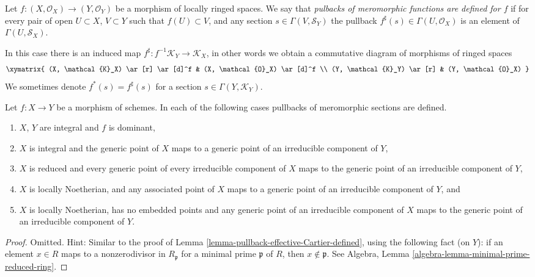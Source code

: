 \begin{definition}
\label{definition-pullback-meromorphic-sections}
Let $f : (X, \mathcal{O}_X) \to (Y, \mathcal{O}_Y)$ be a morphism
of locally ringed spaces. We say that {\it pulbacks of meromorphic
functions are defined for $f$} if for every pair of open
$U \subset X$, $V \subset Y$ such that $f(U) \subset V$, and any
section $s \in \Gamma(V, \mathcal{S}_Y)$ the pullback
$f^\sharp(s) \in \Gamma(U, \mathcal{O}_X)$ is an element
of $\Gamma(U, \mathcal{S}_X)$.
\end{definition}

\noindent
In this case there is an induced map
$f^\sharp : f^{-1}\mathcal{K}_Y \to \mathcal{K}_X$,
in other words we obtain a commutative diagram of morphisms
of ringed spaces
$$
\xymatrix{
(X, \mathcal{K}_X) \ar[r] \ar[d]^f &
(X, \mathcal{O}_X) \ar[d]^f \\
(Y, \mathcal{K}_Y) \ar[r] &
(Y, \mathcal{O}_X)
}
$$
We sometimes denote $f^*(s) = f^\sharp(s)$ for a
section $s \in \Gamma(Y, \mathcal{K}_Y)$.

\begin{lemma}
\label{lemma-pullback-meromorphic-sections-defined}
Let $f : X \to Y$ be a morphism of schemes.
In each of the following cases pullbacks of meromorphic
sections are defined.
\begin{enumerate}
\item $X$, $Y$ are integral and $f$ is dominant,
\item $X$ is integral and the generic point of $X$ maps
to a generic point of an irreducible component of $Y$,
\item $X$ is reduced and every generic point of every irreducible
component of $X$ maps to the generic point of an irreducible component
of $Y$,
\item $X$ is locally Noetherian, and any associated point of
$X$ maps to a generic point of an irreducible component of $Y$, and
\item $X$ is locally Noetherian, has no embedded points and
any generic point of an irreducible component of
$X$ maps to the generic point of an irreducible component of $Y$.
\end{enumerate}
\end{lemma}

\begin{proof}
Omitted. Hint: Similar to the proof of
Lemma \ref{lemma-pullback-effective-Cartier-defined}, using
the following fact (on $Y$): if an element $x \in R$ maps to
a nonzerodivisor in $R_{\mathfrak p}$ for a minimal prime
$\mathfrak p$ of $R$, then $x \not \in \mathfrak p$.
See Algebra, Lemma \ref{algebra-lemma-minimal-prime-reduced-ring}.
\end{proof}

